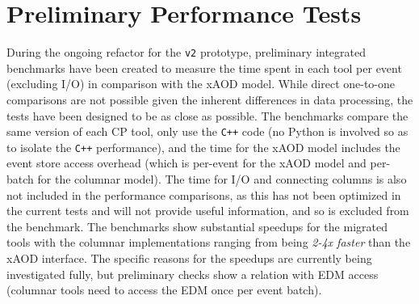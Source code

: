 \section{Preliminary Performance Tests}\label{sec:performance}

During the ongoing refactor for the \texttt{v2} prototype, preliminary integrated benchmarks have been created to measure the time spent in each tool per event (excluding I/O) in comparison with the xAOD model.
While direct one-to-one comparisons are not possible given the inherent differences in data processing, the tests have been designed to be as close as possible.
The benchmarks compare the same version of each CP tool, only use the \texttt{C++} code (no Python is involved so as to isolate the \texttt{C++} performance), and the time for the xAOD model includes the event store access overhead (which is per-event for the xAOD model and per-batch for the columnar model).
The time for I/O and connecting columns is also not included in the performance comparisons, as this has not been optimized in the current tests and will not provide useful information, and so is excluded from the benchmark.
The benchmarks show substantial speedups for the migrated tools with the columnar implementations ranging from being \emph{2-4x faster} than the xAOD interface.
The specific reasons for the speedups are currently being investigated fully, but preliminary checks show a relation with EDM access (columnar tools need to access the EDM once per event batch).
